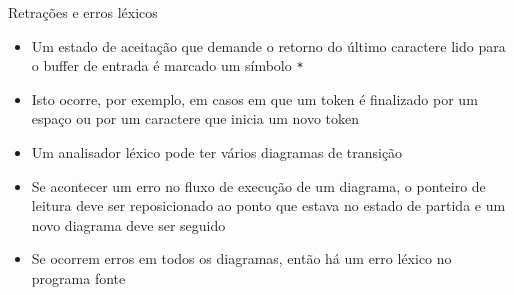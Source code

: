 \begin{frame}[fragile]{Retrações e erros léxicos}

    \begin{itemize}
        \item Um estado de aceitação que demande o retorno do último caractere lido para o buffer de entrada é marcado um símbolo \texttt{*}
        \pause

        \item Isto ocorre, por exemplo, em casos em que um token é finalizado por um espaço ou por um caractere que inicia um novo token
        \pause

        \item Um analisador léxico pode ter vários diagramas de transição
        \pause

        \item Se acontecer um erro no fluxo de execução de um diagrama, o ponteiro de leitura deve ser reposicionado ao ponto que estava no estado de partida
            e um novo diagrama deve ser seguido
        \pause

        \item Se ocorrem erros em todos os diagramas, então há um erro léxico no programa fonte 
    \end{itemize}

\end{frame}

